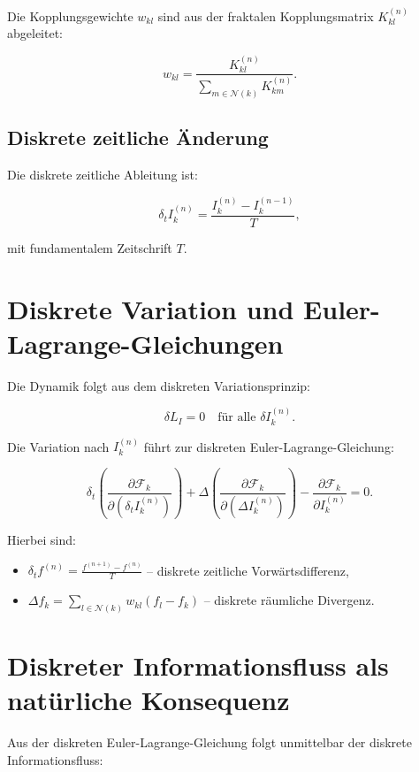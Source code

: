 Die Kopplungsgewichte \( w_{kl} \) sind aus der fraktalen Kopplungsmatrix \( K_{kl}^{(n)} \) abgeleitet:

\[
w_{kl} = \frac{K_{kl}^{(n)}}{\sum_{m \in \mathcal{N}(k)} K_{km}^{(n)}}.
\]

\subsection{Diskrete zeitliche Änderung}
\label{sub:diskrete_zeit_aenderung}

Die diskrete zeitliche Ableitung ist:

\[
\delta_t I_k^{(n)} = \frac{I_k^{(n)} - I_k^{(n-1)}}{T},
\]

mit fundamentalem Zeitschrift \( T \).

\section{Diskrete Variation und Euler-Lagrange-Gleichungen}
\label{sec:euler_lagrange_diskret}

Die Dynamik folgt aus dem diskreten Variationsprinzip:

\[
\delta L_I = 0 \quad \text{für alle } \delta I_k^{(n)}.
\]

Die Variation nach \( I_k^{(n)} \) führt zur diskreten Euler-Lagrange-Gleichung:

\[
\delta_t \left( \frac{\partial \mathcal{F}_k}{\partial (\delta_t I_k^{(n)})} \right) + \Delta \left( \frac{\partial \mathcal{F}_k}{\partial (\Delta I_k^{(n)})} \right) - \frac{\partial \mathcal{F}_k}{\partial I_k^{(n)}} = 0.
\]

Hierbei sind:

\begin{itemize}
    \item \( \delta_t f^{(n)} = \frac{f^{(n+1)} - f^{(n)}}{T} \) – diskrete zeitliche Vorwärtsdifferenz,
    \item \( \Delta f_k = \sum_{l \in \mathcal{N}(k)} w_{kl} (f_l - f_k) \) – diskrete räumliche Divergenz.
\end{itemize}

\section{Diskreter Informationsfluss als natürliche Konsequenz}
\label{sec:informationsfluss_konsequenz}

Aus der diskreten Euler-Lagrange-Gleichung folgt unmittelbar der diskrete Informationsfluss:

